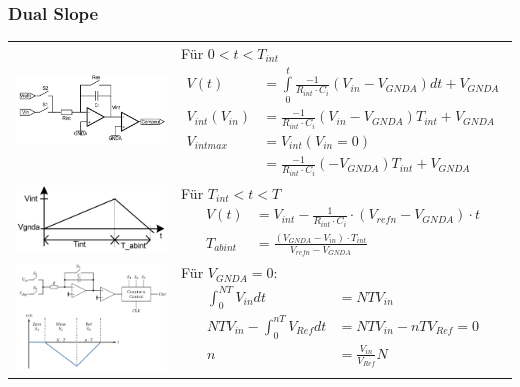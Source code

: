 \subsubsection{Dual Slope }
\begin{tabular}{cp{12cm}}
 \includegraphics[width=6cm, valign=t]{pictures/dualSlope11}
 & 
 {Für $0<t<T_{int}$
 \begin{align*}
      V(t)&=
      \int\limits_0^{t}\frac{-1}{R_{int}
      \cdot C_{i}}(V_{in}-V_{GNDA})dt+V_{GNDA}\\
      V_{int}(V_{in})&=\frac{-1}{R_{int}
      \cdot C_{i}}(V_{in}-V_{GNDA})T_{int}+V_{GNDA}\\
      V_{intmax}&=V_{int}(V_{in}=0)\\
                &=\frac{-1}{R_{int}
      \cdot C_{i}}(-V_{GNDA})T_{int}+V_{GNDA}
 \end{align*}} \\
 
 \includegraphics[width=6cm, valign=t]{pictures/dualSlope12}
 &  
 {Für $T_{int}<t<T$
 \begin{align*}
  V(t)&=V_{int}-\frac{1}{R_{int}\cdot C_{i}}\cdot
  (V_{refn}-V_{GNDA}) \cdot t\\
   T_{abint}&=\frac{(V_{GNDA}-V_{in}) \cdot T_{int}}{V_{refn}-V_{GNDA}}
 \end{align*}}\\
 
 \includegraphics[width=6cm, valign=t]{pictures/dualSlope2}
 &  
 {Für $V_{GNDA}=0$:
  \begin{align*}
    \int^{NT}_{0}V_{in}dt&=NTV_{in}\\
      NTV_{in}-\int^{nT}_{0}V_{Ref}dt&=NTV_{in}-nTV_{Ref}=0\\
      n&=\frac{V_{in}}{V_{Ref}}N\\
  \end{align*}}\\
  

\end{tabular}
